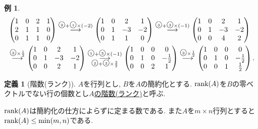 \documentclass[dvipdfmx,a4paper,11pt]{article}
\newcommand{\maru}[1]{\raise0.2ex\hbox{\textcircled{\tiny{#1}}}}
\theoremstyle{definition}
\newtheorem{dfn}[thm]{定義}
\newtheorem{exa}[thm]{例}
\begin{document}
\begin{exa}
 \begin{align*}
 &\begin{pmatrix}
 1& 0& 2  &1\\
 2& 1& 1  &0\\
 0& 1& 1  &0\\
 \end{pmatrix}
 \overset{\maru{2} + \maru{1}\times(-2)}{\longrightarrow} 
\begin{pmatrix}
 1& 0& 2  &1\\
 0& 1& -3 &-2\\
 0& 1& 1  &0\\
 \end{pmatrix}
\overset{\maru{3} + \maru{2}\times(-1)}{\longrightarrow} 
\begin{pmatrix}
 1& 0& 2  &1\\
 0& 1& -3 &-2\\
 0& 0& 4  &2\\
 \end{pmatrix}
 \\ %
 & \overset{\maru{3}\times \frac{1}{2}}{\longrightarrow} 
\begin{pmatrix}
 1& 0& 2  &1\\
 0& 1& -3 &-2\\
 0& 0& 2  &1\\
 \end{pmatrix} 
 \overset{\maru{1} + \maru{3}\times (-1)}{\underset{\maru{2} + \maru{3}\times \frac{3}{2}}{\longrightarrow}}
 \begin{pmatrix}
 1& 0& 0  &0\\
 0& 1& 0 &-\frac{1}{2}\\
 0& 0& 2  &1\\
 \end{pmatrix} 
 \overset{\maru{3}\times \frac{1}{2}}{\longrightarrow} 
  \begin{pmatrix}
 1& 0& 0  &0\\
 0& 1& 0 &-\frac{1}{2}\\
 0& 0& 1 &\frac{1}{2}\\
 \end{pmatrix}.
 \end{align*}
 \end{exa}
 
 
  \begin{tcolorbox}[
    colback = white,
    colframe = green!35!black,
    fonttitle = \bfseries,
    breakable = true]
    \begin{dfn}[階数(ランク)]
$A$を行列とし, $B$を$A$の簡約化とする.
${\rm rank}(A)$を$B$の零ベクトルでない行の個数とし\underline{$A$の階数(ランク)}と呼ぶ.
   \end{dfn}
 \end{tcolorbox}
${\rm rank}(A)$は簡約化の仕方によらずに定まる数である.
また$A$を$m\times n$行列とすると${\rm rank}(A) \le \min(m,n)$である.
\end{document}
